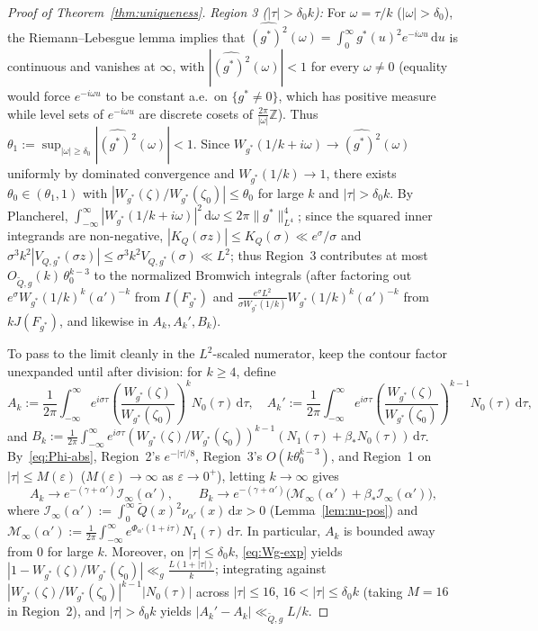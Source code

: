 \documentclass[11pt, reqno]{amsart}
\theoremstyle{remark}
\numberwithin{equation}{section}
\newcommand{\dd}{\,\mathrm{d}}
\begin{document}
\begin{proof}[Proof of Theorem~\ref{thm:uniqueness}]
\emph{Region 3 ($|\tau| > \delta_0 k$):} For $\omega = \tau/k$ ($|\omega| > \delta_0$), the
Riemann--Lebesgue lemma implies that $\widehat{(g^*)^2}(\omega) = \int_0^\infty g^*(u)^2 e^{-i\omega u}\dd u$
is continuous and vanishes at $\infty$, with $|\widehat{(g^*)^2}(\omega)| < 1$ for every $\omega \neq 0$ (equality would force $e^{-i\omega u}$
to be constant a.e.\ on $\{g^* \neq 0\}$, which has positive measure while level sets of $e^{-i\omega u}$ are discrete
cosets of $\frac{2\pi}{|\omega|}\mathbb{Z}$). Thus $\theta_1 := \sup_{|\omega| \ge \delta_0}|\widehat{(g^*)^2}(\omega)| < 1$.
Since $W_{g^*}(1/k+i\omega) \to \widehat{(g^*)^2}(\omega)$ uniformly by dominated convergence and $W_{g^*}(1/k) \to 1$,
there exists $\theta_0 \in (\theta_1, 1)$ with $|W_{g^*}(\zeta)/W_{g^*}(\zeta_0)| \le \theta_0$ for large $k$
and $|\tau| > \delta_0 k$. By Plancherel, $\int_{-\infty}^\infty |W_{g^*}(1/k+i\omega)|^2\dd\omega \le 2\pi\|g^*\|_{L^4}^4$;
since the squared inner integrands are non-negative, $|K_Q(\sigma z)| \le K_Q(\sigma) \ll e^\sigma/\sigma$
and $\sigma^3 k^2 |V_{Q,g^*}(\sigma z)| \le \sigma^3 k^2 V_{Q,g^*}(\sigma) \ll L^2$; thus
Region~3 contributes at most $O_{\widetilde{Q},g}(k)\,\theta_0^{k-3}$ to the normalized Bromwich integrals
(after factoring out $e^\sigma W_{g^*}(1/k)^k (a')^{-k}$ from $I(F_{g^*})$ and
$\frac{e^\sigma L^2}{\sigma W_{g^*}(1/k)} W_{g^*}(1/k)^k (a')^{-k}$ from $k J(F_{g^*})$, and likewise in $A_k, A_k', B_k$).

To pass to the limit cleanly in the $L^2$-scaled numerator, keep the contour factor unexpanded until after
division: for $k \ge 4$, define
\[
A_k := \frac{1}{2\pi}\int_{-\infty}^\infty e^{i\sigma\tau}\!\left(\frac{W_{g^*}(\zeta)}{W_{g^*}(\zeta_0)}\right)^{\!k} N_0(\tau)\dd\tau,
\quad
A_k' := \frac{1}{2\pi}\int_{-\infty}^\infty e^{i\sigma\tau}\!\left(\frac{W_{g^*}(\zeta)}{W_{g^*}(\zeta_0)}\right)^{\!k-1} N_0(\tau)\dd\tau,
\]
and $B_k := \frac{1}{2\pi}\int_{-\infty}^\infty e^{i\sigma\tau}(W_{g^*}(\zeta)/W_{g^*}(\zeta_0))^{k-1}(N_1(\tau) + \beta_* N_0(\tau))\dd\tau$.
By~\eqref{eq:Phi-abs}, Region~2's $e^{-|\tau|/8}$, Region~3's $O(k\theta_0^{k-3})$, and Region~1 on $|\tau| \le M(\varepsilon)$
($M(\varepsilon) \to \infty$ as $\varepsilon \to 0^+$), letting $k \to \infty$ gives
\[
A_k \to e^{-(\gamma+\alpha')}\mathcal{I}_\infty(\alpha'),
\qquad
B_k \to e^{-(\gamma+\alpha')}\bigl(\mathcal{M}_\infty(\alpha') + \beta_*\mathcal{I}_\infty(\alpha')\bigr),
\]
where $\mathcal{I}_\infty(\alpha') := \int_0^\infty \widetilde{Q}(x)^2 \nu_{\alpha'}(x)\dd x > 0$ (Lemma~\ref{lem:nu-pos})
and $\mathcal{M}_\infty(\alpha') := \frac{1}{2\pi}\int_{-\infty}^\infty e^{\Phi_{\alpha'}(1+i\tau)} N_1(\tau)\dd\tau$.
In particular, $A_k$ is bounded away from $0$ for large $k$. Moreover, on $|\tau| \le \delta_0 k$, \eqref{eq:Wg-exp}
yields $|1 - W_{g^*}(\zeta)/W_{g^*}(\zeta_0)| \ll_g \frac{L(1+|\tau|)}{k}$; integrating against $|W_{g^*}(\zeta)/W_{g^*}(\zeta_0)|^{k-1}|N_0(\tau)|$
across $|\tau| \le 16$, $16 < |\tau| \le \delta_0 k$ (taking $M = 16$ in Region~2), and $|\tau| > \delta_0 k$ yields $|A_k' - A_k| \ll_{\widetilde{Q},g} L/k$.


\end{proof}
\end{document}
